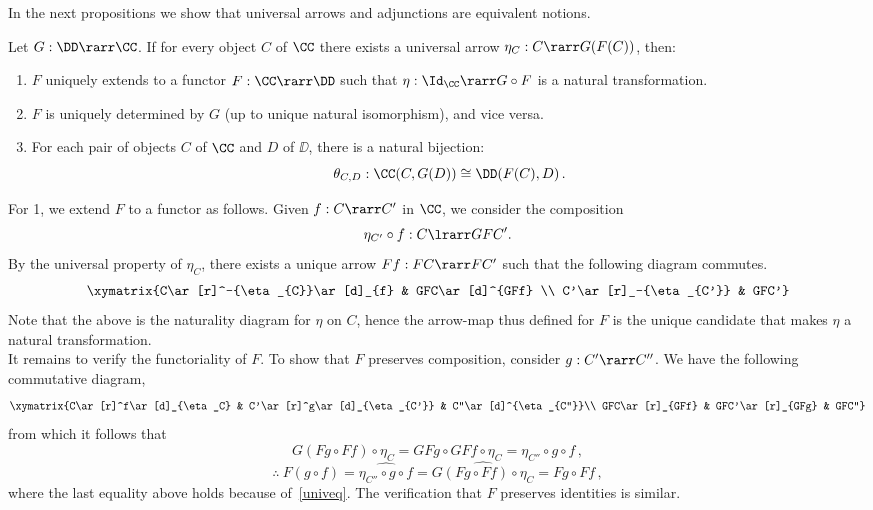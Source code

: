 \documentclass{svmult}
\begin{document}
In the next propositions we show that universal arrows and adjunctions are equivalent notions.

\begin{myproposition}\label{p:UnivtoAdj}
Let $G:\DD\rarr\CC$. If for every object $C$ of $\CC$ there exists a universal arrow $\eta_{C} : C \rarr G(F(C))$, then:
\begin{enumerate}\renewcommand{\theenumi}{\rm\arabic{enumi}}
\item $F$ uniquely extends to a functor $F:\CC\rarr\DD$ such that $\eta : \Id_{\CC} \rarr G \circ F$ is a natural transformation.
\item $F$ is uniquely determined by $G$ (up to unique natural isomorphism), and vice versa.
\item For each pair of objects $C$ of $\CC$ and $D$ of $\DD$, there is a natural bijection:
\[ \theta_{C,D} : \CC(C, G(D))\cong\DD(F(C), D) \,. \]
\end{enumerate}
\end{myproposition}
\proof %
For 1, we extend $F$ to a functor as follows. Given $f : C \rarr C'$ in $\CC$, we consider the composition
\[ \eta_{C'} \circ f : C \lrarr GFC' . \]
By the universal property of $\eta_{C}$, there exists a unique arrow $Ff : FC \rarr FC'$ such that the following diagram commutes.
\[
\xymatrix{C\ar[r]^-{\eta_{C}}\ar[d]_{f} & GFC\ar[d]^{GFf} \\  C'\ar[r]_-{\eta_{C'}} & GFC'}
\]
Note that the above is the naturality diagram for $\eta$ on $C$, hence the arrow-map thus defined for $F$ is the unique candidate that makes
$\eta$ a natural transformation.
\\
It remains to verify the functoriality of $F$. To show that $F$ preserves composition, consider $g : C' \rarr C''$. We have the following commutative
diagram,
\[
\xymatrix{C\ar[r]^f\ar[d]_{\eta_C} & C'\ar[r]^g\ar[d]_{\eta_{C'}} & C''\ar[d]^{\eta_{C''}}\\ GFC\ar[r]_{GFf} & GFC'\ar[r]_{GFg} & GFC''}
\]
from which it follows that
\[ G(Fg \circ Ff) \circ \eta_{C} = GFg \circ GFf \circ \eta_{C} = \eta_{C''} \circ g \circ f\,, \]
\[\therefore\ F(g\circ f)=\widehat{\eta_{C''}\circ g\circ f}=\widehat{G(Fg\circ Ff)\circ\eta_C}=Fg\circ Ff\,, \]
where the last equality above holds because of~\eqref{univeq}. The verification that $F$ preserves identities is similar.
\end{document}
